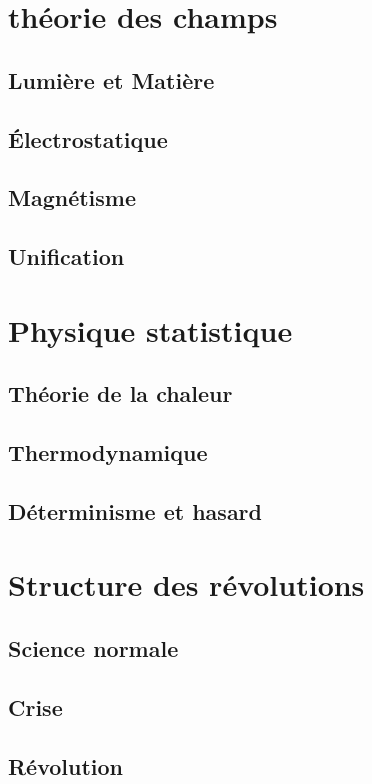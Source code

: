 \section{théorie des champs}
    \subsection{Lumière et Matière}
    \subsection{Électrostatique}
    \subsection{Magnétisme}
    \subsection{Unification}

\section{Physique statistique}
  \subsection{Théorie de la chaleur}
    \subsection{Thermodynamique}
    \subsection{Déterminisme et hasard}

\section{Structure des révolutions}
  \subsection{Science normale}
  \subsection{Crise}
  \subsection{Révolution}




